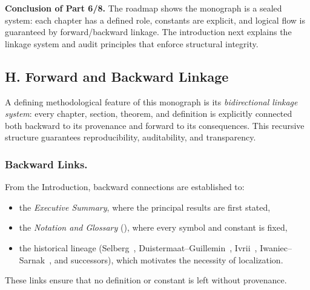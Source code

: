 \medskip

\noindent\textbf{Conclusion of Part 6/8.}
The roadmap shows the monograph is a sealed system:
each chapter has a defined role, constants are explicit,
and logical flow is guaranteed by forward/backward linkage.
The introduction next explains the linkage system and audit principles
that enforce structural integrity.


\subsection*{H. Forward and Backward Linkage}

A defining methodological feature of this monograph is its
\emph{bidirectional linkage system}:
every chapter, section, theorem, and definition
is explicitly connected both backward to its provenance
and forward to its consequences.
This recursive structure guarantees reproducibility,
auditability, and transparency.

\subsubsection*{Backward Links.}
From the Introduction, backward connections are established to:
\begin{itemize}
  \item the \emph{Executive Summary}, where the principal results are first stated,
  \item the \emph{Notation and Glossary} (),
        where every symbol and constant is fixed,
  \item the historical lineage (Selberg~\cite{Selberg1956},
        Duistermaat–Guillemin~\cite{DG1975}, Ivrii~\cite{Ivrii1980},
        Iwaniec–Sarnak~\cite{Iwaniec2002}, and successors),
        which motivates the necessity of localization.
\end{itemize}
These links ensure that no definition or constant is left without provenance.

